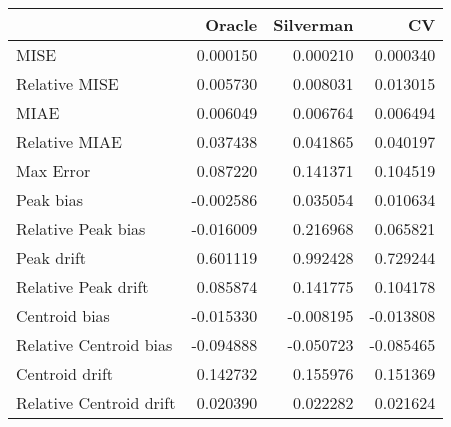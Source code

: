 \begin{tabular}{lrrr}
  \hline
 & Oracle & Silverman & CV \\ 
  \hline
MISE & 0.000150 & 0.000210 & 0.000340 \\ 
  Relative MISE & 0.005730 & 0.008031 & 0.013015 \\ 
  MIAE & 0.006049 & 0.006764 & 0.006494 \\ 
  Relative MIAE & 0.037438 & 0.041865 & 0.040197 \\ 
  Max Error & 0.087220 & 0.141371 & 0.104519 \\ 
  Peak bias & -0.002586 & 0.035054 & 0.010634 \\ 
  Relative Peak bias & -0.016009 & 0.216968 & 0.065821 \\ 
  Peak drift & 0.601119 & 0.992428 & 0.729244 \\ 
  Relative Peak drift & 0.085874 & 0.141775 & 0.104178 \\ 
  Centroid bias & -0.015330 & -0.008195 & -0.013808 \\ 
  Relative Centroid bias & -0.094888 & -0.050723 & -0.085465 \\ 
  Centroid drift & 0.142732 & 0.155976 & 0.151369 \\ 
  Relative Centroid drift & 0.020390 & 0.022282 & 0.021624 \\ 
   \hline
\end{tabular}
